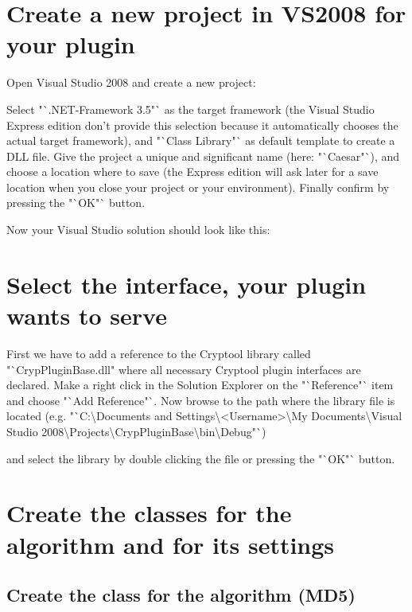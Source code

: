 \section{Create a new project in VS2008 for your plugin}\label{sec:CreateANewProjectInVS2008ForYourPlugin}
Open Visual Studio 2008 and create a new project:



Select "`.NET-Framework 3.5"` as the target framework (the Visual Studio Express edition don't provide this selection because it automatically chooses the actual target framework), and "`Class Library"` as default template to create a DLL file. Give the project a unique and significant name (here: "`Caesar"`), and choose a location where to save (the Express edition will ask later for a save location when you close your project or your environment).  Finally confirm by pressing the "`OK"` button.




Now your Visual Studio solution should look like this:





\section{Select the interface, your plugin wants to serve}\label{sec:SelectTheInterfaceYourPluginWantsToServe}
First we have to add a reference to the Cryptool library called "`CrypPluginBase.dll" where all necessary Cryptool plugin interfaces are declared.
Make a right click in the Solution Explorer on the "`Reference"` item and choose "`Add Reference"`. Now browse to the path where the library file is located (e.g. "`C:\backslash Documents and Settings\backslash <Username>\backslash My Documents\backslash Visual Studio 2008\backslash Projects\backslash CrypPluginBase\backslash bin\backslash Debug"`) 

and select the library by double clicking the file or pressing the "`OK"` button.
 

\section{Create the classes for the algorithm and for its settings}\label{sec:CreateTheClassesForTheAlgorithmAndForItsSettings}
\subsection{Create the class for the algorithm (MD5)}\label{sec:CreateTheClassForTheAlgorithmMD5}
